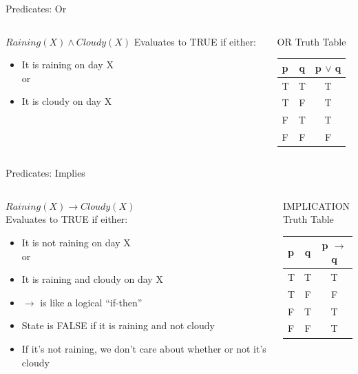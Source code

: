 \documentclass[aspectratio=169]{beamer}
\begin{document}
\begin{frame}{Predicates: Or}
\begin{columns}[t]
\begin{column}{0.6\textwidth}
$Raining(X) \wedge Cloudy(X)$
Evaluates to TRUE if either:
\begin{itemize}
\item It is raining on day X\\
or
\item It is cloudy on day X
\end{itemize}
\end{column}
\begin{column}{0.4\textwidth}
OR Truth Table\\
\begin{tabular}{|l|c||c| }  \hline
\textbf{p} & \textbf{q} & \textbf{p $\vee$ q}\\ \hline
T & T & T\\ \hline
T & F & T\\ \hline
F & T & T\\ \hline
F & F & F\\ \hline
\end{tabular}
\end{column}
\end{columns}
\end{frame}

\begin{frame}{Predicates: Implies}
\begin{columns}[t]
\begin{column}{0.6\textwidth}
$Raining(X) \rightarrow Cloudy(X)$\\
Evaluates to TRUE if either:
\begin{itemize}
\item It is not raining on day X\\
or
\item It is raining and cloudy on day X
\item $\rightarrow$ is like a logical ``if-then''
\item State is FALSE if it is raining and not cloudy
\item If it's not raining, we don't care about whether or not it's cloudy
\end{itemize}
\end{column}
\begin{column}{0.4\textwidth}
IMPLICATION\\Truth Table\\
\begin{tabular}{|l|c||c| }  \hline
\textbf{p} & \textbf{q} & \textbf{p $\rightarrow$ q}\\ \hline
T & T & T\\ \hline
T & F & F\\ \hline
F & T & T\\ \hline
F & F & T\\ \hline
\end{tabular}
\end{column}
\end{columns}
\end{frame}
\end{document}
